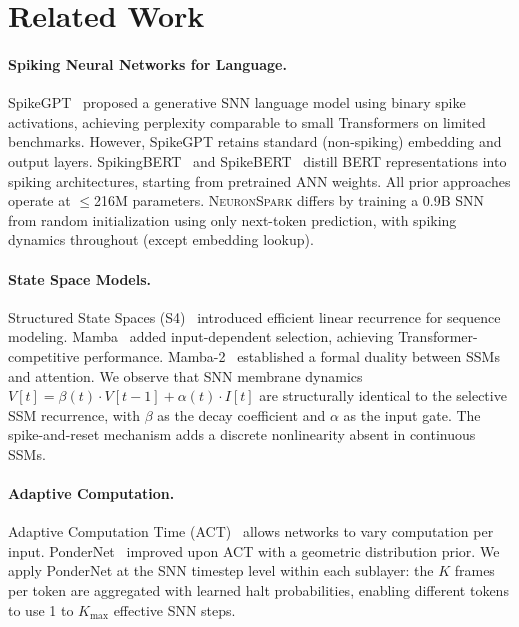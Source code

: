 \documentclass{article}
\newcommand{\model}{\textsc{NeuronSpark}}
\begin{document}
\section{Related Work}
\label{sec:related}

\paragraph{Spiking Neural Networks for Language.}
SpikeGPT~\citep{zhu2024spikegpt} proposed a generative SNN language model using binary spike activations, achieving perplexity comparable to small Transformers on limited benchmarks.
However, SpikeGPT retains standard (non-spiking) embedding and output layers.
SpikingBERT~\citep{bal2024spikingbert} and SpikeBERT~\citep{lv2023spikebert} distill BERT representations into spiking architectures, starting from pretrained ANN weights.
All prior approaches operate at $\leq$216M parameters.
\model{} differs by training a 0.9B SNN from random initialization using only next-token prediction, with spiking dynamics throughout (except embedding lookup).

\paragraph{State Space Models.}
Structured State Spaces (S4)~\citep{gu2022efficiently} introduced efficient linear recurrence for sequence modeling.
Mamba~\citep{gu2024mamba} added input-dependent selection, achieving Transformer-competitive performance.
Mamba-2~\citep{dao2024transformers} established a formal duality between SSMs and attention.
We observe that SNN membrane dynamics $V[t] = \beta(t) \cdot V[t-1] + \alpha(t) \cdot I[t]$ are structurally identical to the selective SSM recurrence, with $\beta$ as the decay coefficient and $\alpha$ as the input gate.
The spike-and-reset mechanism adds a discrete nonlinearity absent in continuous SSMs.

\paragraph{Adaptive Computation.}
Adaptive Computation Time (ACT)~\citep{graves2016adaptive} allows networks to vary computation per input.
PonderNet~\citep{banino2021pondernet} improved upon ACT with a geometric distribution prior.
We apply PonderNet at the SNN timestep level within each sublayer: the $K$ frames per token are aggregated with learned halt probabilities, enabling different tokens to use 1 to $K_{\max}$ effective SNN steps.
\end{document}
